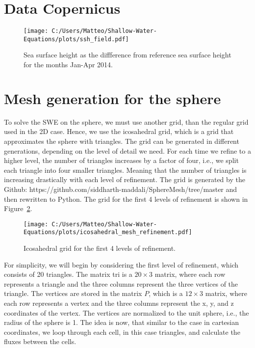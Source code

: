\section{Data Copernicus}

\begin{figure}[H]
    \centering
    \texttt{[image: C:/Users/Matteo/Shallow-Water-Equations/plots/ssh\_field.pdf]}
    \caption{Sea surface height as the diffference from reference sea surface height for the months Jan-Apr 2014.}\label{fig:copernices-ssh}
\end{figure}


\section{Mesh generation for the sphere}
To solve the SWE on the sphere, we must use another grid, than the regular grid used in the 2D case.
Hence, we use the icosahedral grid, which is a grid that approximates the sphere with triangles.
The grid can be generated in different generations, depending on the level of detail we need. 
For each time we refine to a higher level, the number of triangles increases by a factor of four, i.e., we split each triangle into four smaller triangles.
Meaning that the number of triangles is increasing drastically with each level of refinement.
The grid is generated by the Github: https://github.com/siddharth-maddali/SphereMesh/tree/master and then rewritten to Python.
The grid for the first 4 levels of refinement is shown in Figure~\ref{fig:icosahedral_grid}.
\begin{figure}
    \centering
    \texttt{[image: C:/Users/Matteo/Shallow-Water-Equations/plots/icosahedral\_mesh\_refinement.pdf]}
    \caption{Icosahedral grid for the first 4 levels of refinement.}\label{fig:icosahedral_grid}
\end{figure}
For simplicity, we will begin by considering the first level of refinement, which consists of 20 triangles.
The matrix tri is a $20 \times 3$ matrix, where each row represents a triangle and the three columns represent the three vertices of the triangle.
The vertices are stored in the matrix $P$, which is a $12 \times 3$ matrix, where each row represents a vertex and the three columns represent the x, y, and z coordinates of the vertex.
The vertices are normalized to the unit sphere, i.e., the radius of the sphere is 1.
The idea is now, that similar to the case in cartesian coordinates, we loop through each cell, in this case triangles, and calculate the fluxes between the cells.
